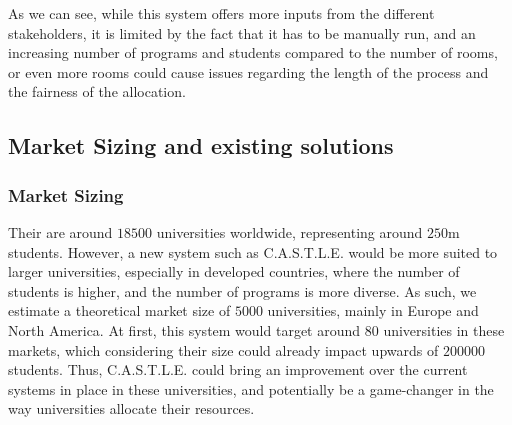 \documentclass[a4paper, oneside]{article}
\newcommand{\castle}{C{\small.}A{\small.}S{\small.}T{\small.}L{\small.}E{\small.}}
\begin{document}
\linebreak

As we can see, while this system offers more inputs from the different stakeholders, it is limited by the fact that it has to be
manually run, and an increasing number of programs and students compared to the number of rooms, or even more rooms could cause issues
regarding the length of the process and the fairness of the allocation.

\subsection{Market Sizing and existing solutions}
\subsubsection{Market Sizing}
Their are around $18500$ universities worldwide, representing around $250$m students. However, a new system such as \castle{} would be more suited to larger universities, especially in developed countries, where the number of students is higher, and the number of programs is more diverse.
As such, we estimate a theoretical market size of $5000$ universities, mainly in Europe and North America.
At first, this system would target around 80 universities in these markets, which considering their size could already impact upwards of $200000$ students.
Thus, \castle{} could bring an improvement over the current systems in place in these universities, and potentially be a game-changer in the way universities allocate their resources.
\end{document}

